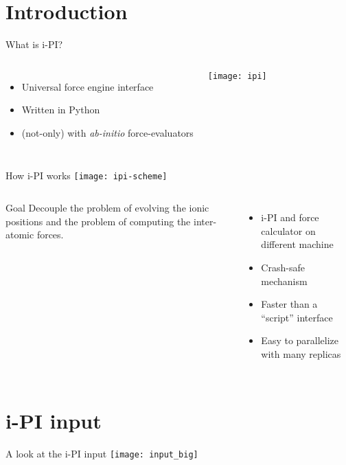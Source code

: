 \section{Introduction}
\begin{frame}{What is i-PI?}
 \begin{columns}
   \begin{itemize}
   \item Universal force engine interface
     \vspace{0.3cm}
   \item Written in Python
     \vspace{0.3cm}
   \item (not-only) with \emph{ab-initio}
     force-evaluators 
   \end{itemize}
   \texttt{[image: ipi]}
 \end{columns}
\end{frame}

\begin{frame}{How i-PI works}
  \texttt{[image: ipi-scheme]}
  
  \begin{columns}
    \begin{block}{Goal}
      Decouple the problem of evolving the ionic positions and the
      problem of computing the inter-atomic forces.
    \end{block}
    \begin{itemize}
      \item i-PI and force calculator on different machine
      \item Crash-safe mechanism
      \item Faster than a ``script'' interface
      \item Easy to parallelize with many replicas
    \end{itemize}
  \end{columns}
\end{frame}

\section{i-PI input}

\begin{frame}{A look at the i-PI input}
\texttt{[image: input\_big]}
\end{frame}

